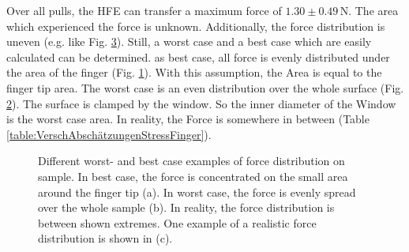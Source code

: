 Over all pulls, the HFE can transfer a maximum force of $1.30\pm0.49\,\si{\newton}$. The area which experienced the force is unknown. Additionally, the force distribution is uneven (e.g. like Fig. \ref{fig:ZeichnungBerechnungStress_c}). Still, a worst case and a best case which are easily calculated can be determined. as best case, all force is evenly distributed under the area of the finger (Fig. \ref{fig:ZeichnungBerechnungStress_a}). With this assumption, the Area is equal to the finger tip area. The worst case is an even distribution over the whole surface (Fig. \ref{fig:ZeichnungBerechnungStress_b}). The surface is clamped by the window. So the inner diameter of the Window is the worst case area. In reality, the Force is somewhere in between (Table \ref{table:VerschAbschätzungenStressFinger}).

\begin{figure}[hbt!]
	\centering
	\begin{subfigure}[]{0.3\textwidth}
		\centering
		
		\caption{}
		\label{fig:ZeichnungBerechnungStress_a}
	\end{subfigure}
	\begin{subfigure}[]{0.3\textwidth}
		\centering
		
		\caption{}
		\label{fig:ZeichnungBerechnungStress_b}
	\end{subfigure}
		\begin{subfigure}[]{0.3\textwidth}
		\centering
		
		\caption{}
		\label{fig:ZeichnungBerechnungStress_c}
	\end{subfigure}
	\caption{Different worst- and best case examples of force distribution on sample. In best case, the force is concentrated on the small area around the finger tip (a). In worst case, the force is evenly spread over the whole sample (b). In reality, the force distribution is between shown extremes. One example of a realistic force distribution is shown in (c).}
	\label{fig:ZeichnungBerechnungStress}
\end{figure}


